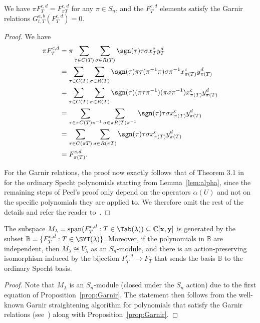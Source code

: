 \begin{prop}\label{prop:Garnir}
	We have $\pi F_T^{c,d} = F_{\pi T}^{c,d}$ for any $\pi\in S_n$, and the $F_T^{c,d}$ elements satisfy the Garnir relations  $G^{a,b}_{t,T}(F_T^{c,d})=0$.
\end{prop}

\begin{proof}
	We have 
	\begin{align*}
	\pi F_T^{c,d} &= \pi \sum_{\tau \in C(T)}\sum_{\sigma \in R(T)}\sgn(\tau) \tau \sigma x_T^cy_T^d\\
	&= \sum_{\tau\in C(T)}\sum_{\sigma\in R(T)}\sgn(\tau)\pi\tau(\pi^{-1}\pi)\sigma\pi^{-1}x_{\pi(T)}^c y_{\pi(T)}^d \\
	&= \sum_{\tau\in C(T)}\sum_{\sigma\in R(T)}\sgn(\tau)(\pi\tau\pi^{-1})(\pi\sigma\pi^{-1})x_{\pi(T)}^c y_{\pi(T)}^d \\
	&= \sum_{\tau\in \pi C(T)\pi^{-1}}\sum_{\sigma\in \pi R(T)\pi^{-1}}\sgn(\tau)\tau \sigma x_{\pi(T)}^c y_{\pi(T)}^d \\
	&= \sum_{\tau\in C(\pi T)}\sum_{\sigma\in R(\pi T)}\sgn(\tau)\tau \sigma x_{\pi(T)}^c y_{\pi(T)}^d \\
	&= F^{c,d}_{\pi(T)}.
	\end{align*}  
	
	For the Garnir relations, the proof now exactly follows that of Theorem 3.1 in~\cite{Peel} for the ordinary Specht polynomials starting from Lemma~\ref{lem:alpha}, since the remaining steps of Peel's proof only depend on the operators $\alpha(U)$ and not on the specific polynomials they are applied to.  We therefore omit the rest of the details and refer the reader to~\cite{Peel}.
\end{proof}

\begin{prop}\label{prop:irreducible}
	The subspace $M_\lambda=\mathrm{span}(F_T^{c,d}:T\in \Tab(\lambda))\subseteq \mathbb{C}[\mathbf{x},\mathbf{y}]$ is generated by the subset $\mathbb{B}=\{F_T^{c,d}:T\in \SYT(\lambda)\}$.  Moreover, if the polynomials in $\mathbb{B}$ are independent, then $M_\lambda\cong V_\lambda$ as an $S_n$-module, and there is an action-preserving isomorphism induced by the bijection $F_T^{c,d}\to F_T$ that sends the basis $\mathbb{B}$ to the ordinary Specht basis.
\end{prop}

\begin{proof}
	Note that $M_\lambda$
	is an $S_n$-module (closed under the $S_n$ action) due to the first equation of Proposition~\ref{prop:Garnir}. 
	The statement then follows from the well-known Garnir straightening algorithm for polynomials that satisfy the Garnir relations (see~\cite{Sagan}) along with Proposition~\ref{prop:Garnir}.
\end{proof}


